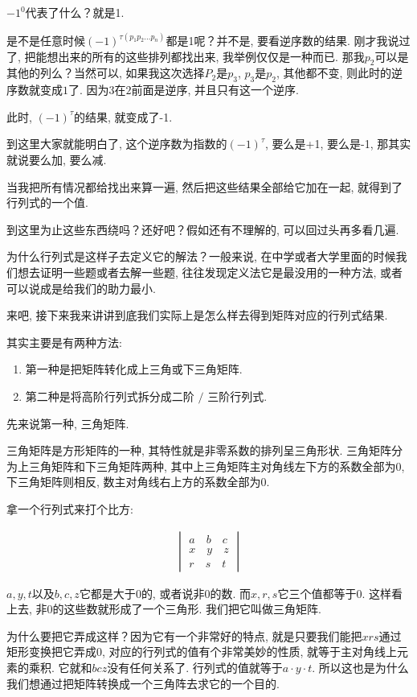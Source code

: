 $-1^0$代表了什么？就是1. 

是不是任意时候$(-1)^{\tau(p_1p_2...p_n)}$都是1呢？并不是, 要看逆序数的结果. 刚才我说过了, 把能想出来的所有的这些排列都找出来, 我举例仅仅是一种而已. 那我$p_2$可以是其他的列么？当然可以, 如果我这次选择$P_2$是$p_3$,  $p_3$是$p_2$, 其他都不变, 则此时的逆序数就变成$1$了. 因为$3$在$2$前面是逆序, 并且只有这一个逆序. 

此时, $(-1)^\tau$的结果, 就变成了-1. 

到这里大家就能明白了, 这个逆序数为指数的$(-1)^\tau$, 要么是+1, 要么是-1, 那其实就说要么加, 要么减. 

当我把所有情况都给找出来算一遍, 然后把这些结果全部给它加在一起, 就得到了行列式的一个值. 

到这里为止这些东西绕吗？还好吧？假如还有不理解的, 可以回过头再多看几遍. 

为什么行列式是这样子去定义它的解法？一般来说, 在中学或者大学里面的时候我们想去证明一些题或者去解一些题, 往往发现定义法它是最没用的一种方法, 或者可以说成是给我们的助力最小. 

来吧, 接下来我来讲讲到底我们实际上是怎么样去得到矩阵对应的行列式结果. 

其实主要是有两种方法: 

\begin{enumerate}
  \item 第一种是把矩阵转化成上三角或下三角矩阵. 
  \item 第二种是将高阶行列式拆分成二阶 $/$ 三阶行列式. 
\end{enumerate}

先来说第一种, 三角矩阵. 

三角矩阵是方形矩阵的一种, 其特性就是非零系数的排列呈三角形状. 三角矩阵分为上三角矩阵和下三角矩阵两种, 其中上三角矩阵主对角线左下方的系数全部为0,  下三角矩阵则相反, 数主对角线右上方的系数全部为0.

拿一个行列式来打个比方: 

\begin{align*}
  \begin{vmatrix}
    a \quad b \quad c \\
    x \quad y \quad z \\
    r \quad s \quad t
  \end{vmatrix}
\end{align*}

$a, y, t$以及$b, c, z$它都是大于$0$的, 或者说非$0$的数. 而$x, r, s$它三个值都等于$0$. 这样看上去, 非$0$的这些数就形成了一个三角形. 我们把它叫做三角矩阵. 

为什么要把它弄成这样？因为它有一个非常好的特点, 就是只要我们能把$xrs$通过矩形变换把它弄成0, 对应的行列式的值有个非常美妙的性质, 就等于主对角线上元素的乘积. 它就和$bcz$没有任何关系了. 行列式的值就等于$a \cdot y \cdot t$. 所以这也是为什么我们想通过把矩阵转换成一个三角阵去求它的一个目的. 

